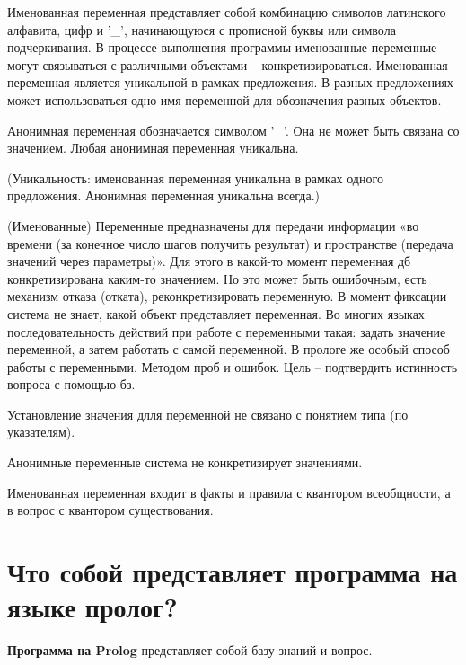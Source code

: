 \documentclass[12pt]{report}
\begin{document}
Именованная переменная представляет собой комбинацию символов латинского алфавита, цифр и ’\_’, начинающуюся с прописной буквы или символа подчеркивания. В процессе выполнения программы именованные переменные могут связываться с различными объектами – конкретизироваться. Именованная переменная является уникальной в рамках предложения. В разных предложениях может использоваться одно имя переменной для обозначения разных объектов.

Анонимная  переменная обозначается символом ’\_’. Она не может быть связана со значением. Любая анонимная переменная уникальна.

(Уникальность: именованная переменная уникальна в рамках одного предложения. Анонимная переменная уникальна всегда.)

(Именованные) Переменные предназначены для передачи информации «во времени (за конечное число шагов получить результат) и пространстве (передача значений через параметры)». Для этого в какой-то момент переменная дб конкретизирована каким-то значением. Но это может  быть ошибочным, есть механизм отказа (отката), реконкретизировать переменную. В момент фиксации система не знает, какой объект представляет переменная. Во многих языках последовательность действий при работе с переменными такая: задать значение переменной, а затем работать с самой переменной. В прологе же особый способ работы с переменными. Методом проб и ошибок. Цель -- подтвердить истинность вопроса с помощью бз. 

Установление значения длля переменной не связано с понятием типа  (по указателям). 

Анонимные переменные система не конкретизирует значениями.


Именованная переменная входит в факты и правила с квантором всеобщности, а в вопрос с квантором существования.








\section{Что собой представляет программа на языке пролог?}

\textbf{Программа на Prolog} представляет собой базу знаний и вопрос. 
\end{document}
